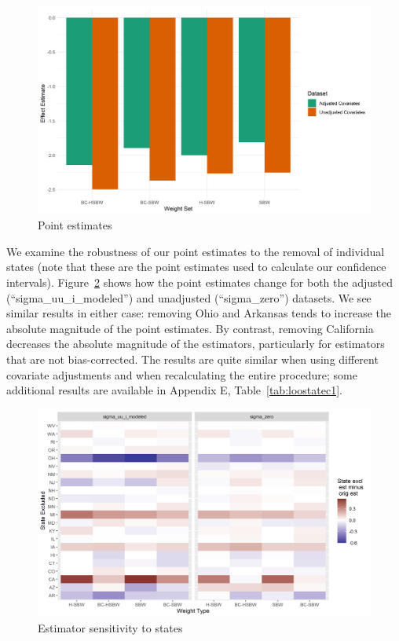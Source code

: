 \documentclass[12pt]{article}
\begin{document}
\begin{figure}[B]
\begin{center}
    \includegraphics[scale=0.6]{01_Plots/point-estimates-c1.png}
    \caption{Point estimates}
    \label{fig:estimators}
\end{center}
\end{figure}

We examine the robustness of our point estimates to the removal of individual states (note that these are the point estimates used to calculate our confidence intervals). Figure~\ref{fig:loostateplot} shows how the point estimates change for both the adjusted (``sigma\_uu\_i\_modeled'') and unadjusted (``sigma\_zero'') datasets. We see similar results in either case: removing Ohio and Arkansas tends to increase the absolute magnitude of the point estimates. By contrast, removing California decreases the absolute magnitude of the estimators, particularly for estimators that are not bias-corrected. The results are quite similar when using different covariate adjustments and when recalculating the entire procedure; some additional results are available in Appendix E, Table~\ref{tab:loostatec1}. 

\begin{figure}[]
\begin{center}
    \includegraphics[scale=0.6]{01_Plots/loostate-sensitivityc1-state-uu-i.png}
    \caption{Estimator sensitivity to states}
    \label{fig:loostateplot}
\end{center}
\end{figure}
\end{document}
